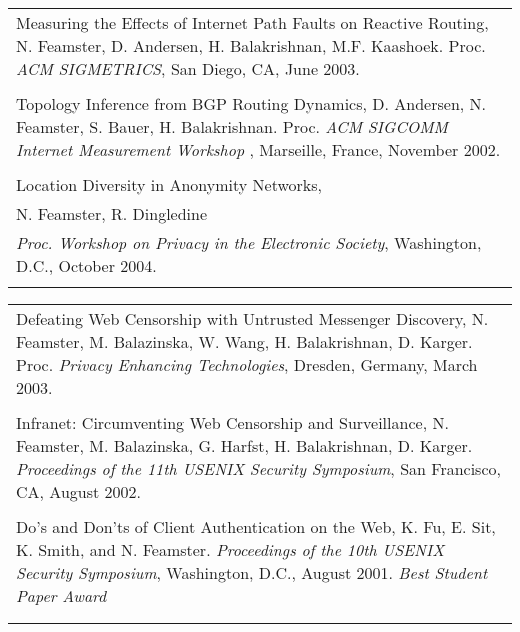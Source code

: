\documentclass{article}
\begin{document}
\begin{flushleft}
\begin{tabular}{p{7 in}}
{\sc Measuring the Effects of Internet Path Faults on Reactive Routing},
N. Feamster, D. Andersen, H. Balakrishnan, M.F. Kaashoek. Proc. {\it ACM
  SIGMETRICS}, San Diego, CA, June 2003. \\ \\

{\sc Topology Inference from BGP Routing Dynamics},
D. Andersen, N. Feamster, S. Bauer, H. Balakrishnan. Proc. {\it ACM
  SIGCOMM Internet Measurement Workshop
  }, Marseille, France, November 
2002. \\ \\


{\sc Location Diversity in Anonymity Networks}, \\
N. Feamster, R. Dingledine \\ 
{\it Proc. Workshop on Privacy in the Electronic Society}, Washington,
D.C., October 
2004. \\ \\


\end{tabular}

\begin{tabular}{p{7 in}}


{\sc Defeating Web Censorship with Untrusted Messenger Discovery},
N. Feamster, M. Balazinska, W. Wang, H. Balakrishnan, D. Karger.
Proc. {\it Privacy Enhancing Technologies}, Dresden, Germany, March
2003. \\ \\


{\sc Infranet: Circumventing Web Censorship and Surveillance},
N. Feamster, M. Balazinska, G. Harfst, H. Balakrishnan, D. Karger. {\it
Proceedings of the 11th USENIX Security Symposium}, San Francisco, CA,
August 2002. \\ \\ 

{\sc Do's and Don'ts of Client Authentication on the Web}, K. Fu, E. Sit,
K. Smith, and N. Feamster. {\it Proceedings of the 10th USENIX Security
Symposium}, Washington, D.C., August 2001. {\it Best Student Paper
Award}  \\ \\ 



\hspace{-0.075in}{\bf Network Video: Streaming and Coding}\\


\end{tabular}
\end{flushleft}
\end{document}
